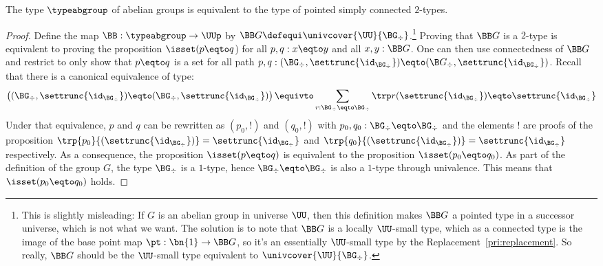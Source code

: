 \begin{theorem}\label{thm:abelian-groups-weq-sc2types}%
  The type $\typeabgroup$ of abelian groups is equivalent to the type
  of pointed simply connected $2$-types. 
\end{theorem}
\begin{proof}
  Define the map $\BB : \typeabgroup \to \UUp$ by
  $\BB G\defequi \univcover{\UU}{\BG_\div}$.\footnote{%
    This is slightly misleading: If $G$ is an abelian group in
    universe $\UU$, then this definition makes $\BB G$ a pointed type
    in a successor universe, which is not what we want.  The solution
    is to note that $\BB G$ is a locally $\UU$-small type, which as a
    connected type is the image of the base point map
    $\pt : \bn{1} \to \BB G$, so it's an essentially $\UU$-small type
    by the Replacement~\cref{pri:replacement}.  So really, $\BB G$
    should be the $\UU$-small type equivalent to
    $\univcover{\UU}{\BG_\div}$.
    
    }  Proving that $\BB G$ is a $2$-type
  is equivalent to proving the proposition $\isset(p\eqto q$) for all
  $p,q:x\eqto y$ and all $x,y:\BB G$. One can then use connectedness
  of $\BB G$ and restrict to only show that $p\eqto q$ is a set for
  all path
  $p,q:(\BG_\div,\settrunc{\id_{\BG_\div}})\eqto ({\B
    G}_\div,\settrunc{\id_{\BG_\div}})$. Recall that there is a
  canonical equivalence of type:
  \begin{equation}\label{eq:}
    \left(
      (\BG_\div,\settrunc{\id_{\BG_\div}})\eqto (\BG_\div,\settrunc{\id_{\BG_\div}})
    \right)
    \equivto
    \sum_{r:\BG_\div \eqto \BG_\div}\trp r (\settrunc{\id_{\BG_\div}}) \eqto \settrunc{\id_{\BG_\div}}
  \end{equation}
  Under that equivalence, $p$ and $q$ can be rewritten as $(p_0,!)$
  and $(q_0,!)$ with $p_0,q_0 : \BG_\div\eqto \BG_\div$ and the
  elements $!$ are proofs of the proposition
  $\trp {p_0} {(\settrunc{\id_{\BG_\div}})} =
  \settrunc{\id_{\BG_\div}}$ and
  $\trp {q_0} {(\settrunc{\id_{\BG_\div}})} =
  \settrunc{\id_{\BG_\div}}$ respectively. As a consequence, the
  proposition $\isset(p\eqto q)$ is equivalent to the proposition
  $\isset(p_0\eqto q_0)$. As part of the definition of the group $G$,
  the type $\BG_\div$ is a $1$-type, hence $\BG_\div\eqto \BG_\div$ is
  also a $1$-type through univalence. This means that
  $\isset(p_0\eqto q_0)$ holds.


\end{proof}
